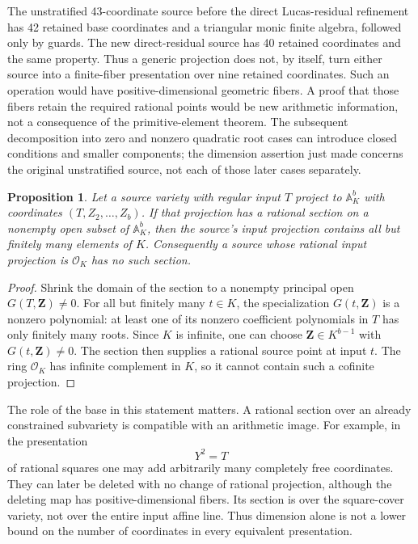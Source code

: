 \documentclass[11pt]{article}
\newtheorem{proposition}[theorem]{Proposition}
\theoremstyle{definition}
\begin{document}
The unstratified 43-coordinate source before the direct Lucas-residual
refinement has 42 retained base coordinates and a triangular monic
finite algebra, followed only by guards.  The new direct-residual
source has 40 retained coordinates and the same property.  Thus a
generic projection does not, by itself, turn either source into a
finite-fiber presentation over nine retained coordinates.  Such an
operation would have positive-dimensional geometric fibers.  A proof
that those fibers retain the required rational points would be new
arithmetic information, not a consequence of the primitive-element
theorem.  The subsequent decomposition into zero and nonzero quadratic
root cases can introduce closed conditions and smaller components;
the dimension assertion just made concerns the original unstratified
source, not each of those later cases separately.

\begin{proposition}\label{p3sys:no-generic-rational-section}
Let a source variety with regular input $T$ project to
$\mathbb A^b_K$ with coordinates $(T,Z_2,\ldots,Z_b)$.
If that projection has a rational section on a nonempty open
subset of $\mathbb A^b_K$, then the source's input projection
contains all but finitely many elements of $K$.
Consequently a source whose rational input projection is
$\mathcal O_K$ has no such section.
\end{proposition}
\begin{proof}
Shrink the domain of the section to a nonempty principal open
$G(T,\mathbf Z)\ne0$.  For all but finitely many $t\in K$,
the specialization $G(t,\mathbf Z)$ is a nonzero polynomial:
at least one of its nonzero coefficient polynomials in $T$
has only finitely many roots.  Since $K$ is infinite, one can
choose $\mathbf Z\in K^{b-1}$ with $G(t,\mathbf Z)\ne0$.
The section then supplies a rational source point at input $t$.
The ring $\mathcal O_K$ has infinite complement in $K$, so it
cannot contain such a cofinite projection.
\end{proof}

The role of the base in this statement matters.  A rational section
over an already constrained subvariety is compatible with an
arithmetic image.  For example, in the presentation
\[
                         Y^2=T
\]
of rational squares one may add arbitrarily many completely free
coordinates.  They can later be deleted with no change of rational
projection, although the deleting map has positive-dimensional fibers.
Its section is over the square-cover variety, not over the entire
input affine line.  Thus dimension alone is not a lower bound on the
number of coordinates in every equivalent presentation.
\end{document}
